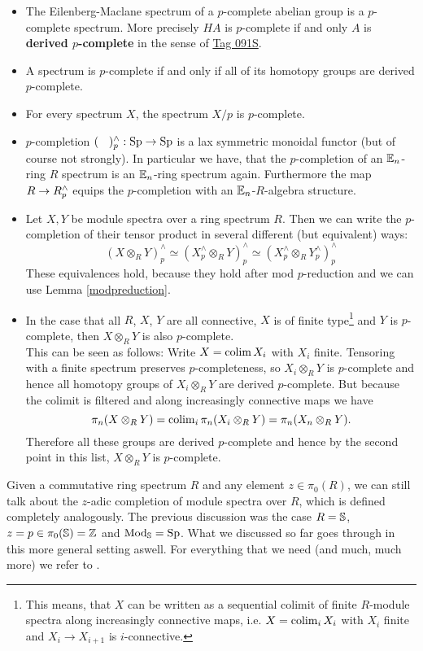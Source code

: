 \begin{itemize}
    \item The Eilenberg-Maclane spectrum of a $p$-complete abelian group is a $p$-complete spectrum. More precisely $HA$ is $p$-complete if and only $A$ is \textbf{derived $p$-complete} in the sense of \href{https://stacks.math.columbia.edu/tag/091S}{Tag 091S}.
    \item A spectrum is $p$-complete if and only if all of its homotopy groups are derived $p$-complete.
    \item For every spectrum $X$, the spectrum $X/p$ is $p$-complete.
    \item $p$-completion $(\phantom{X})^{\wedge}_p:\Sp\to\Sp$ is a lax symmetric monoidal functor (but of course not strongly).
    In particular we have, that the $p$-completion of an $\En$-ring $R$ spectrum is an $\En$-ring spectrum again. Furthermore the map $R\ra R_p^{\wedge}$ equips the $p$-completion with an $\En$-$R$-algebra structure.
    \item Let $X,Y$ be module spectra over a ring spectrum $R$. Then we can write the $p$-completion of their tensor product in several different (but equivalent) ways:
    \begin{equation*}
        \left( X\otimes_R Y \right)_p^{\wedge}\simeq\left( X_p^{\wedge}\otimes_R Y \right)_p^{\wedge} \simeq\left( X_p^{\wedge}\otimes_R Y_p^{\wedge} \right)_p^{\wedge} 
    \end{equation*}
    These equivalences hold, because they hold after mod $p$-reduction and we can use Lemma \ref{modpreduction}.
    \item In the case that all $R$, $X$, $Y$ are all connective, $X$ is of finite type\footnote{This means, that $X$ can be written as a sequential colimit of finite $R$-module spectra along increasingly connective maps, i.e. $X=\colim_i X_i$ with $X_i$ finite and $X_i\to X_{i+1}$ is $i$-connective.} and $Y$ is $p$-complete, then $X\otimes_R Y$ is also $p$-complete. \\
    This can be seen as follows: Write $X=\colim X_i$ with $X_i$ finite. Tensoring with a finite spectrum preserves $p$-completeness, so $X_i\otimes_R Y$ is $p$-complete and hence all homotopy groups of $X_i\otimes_R Y$ are derived $p$-complete. But because the colimit is filtered and along increasingly connective maps we have
    \begin{equation*}
        \pi_n(X\otimes_R Y)=\colim_i \pi_n(X_i\otimes_R Y)=\pi_n(X_n\otimes_R Y).
    \end{equation*}
    Therefore all these groups are derived $p$-complete and hence by the second point in this list, $X\otimes_R Y$ is $p$-complete.
\end{itemize}
Given a commutative ring spectrum $R$ and any element $z\in\pi_0(R)$, we can still talk about the $z$-adic completion of module spectra over $R$, which is defined completely analogously. The previous discussion was the case $R=\S$, $z=p\in\pi_0(\S)=\Z$ and $\Mod_\S=\Sp$. What we discussed so far goes through in this more general setting aswell. For everything that we need (and much, much more) we refer to \cite[Section~7.3]{SAG}.

